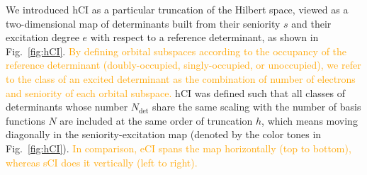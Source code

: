 \documentclass[aip,jcp,reprint,noshowkeys,superscriptaddress]{revtex4-1}
\newcommand{\fk}[1]{\textcolor{orange}{#1}}
\newcommand{\Ndet}{N_\text{det}}
\begin{document}
We introduced hCI \cite{Kossoski_2022} as a particular truncation of the Hilbert space,
viewed as a two-dimensional map of determinants built from their seniority $s$ and their excitation degree $e$ with respect to a reference determinant, as shown in Fig.~\ref{fig:hCI}. 
\fk{By defining orbital subspaces according to the occupancy of the reference determinant (doubly-occupied, singly-occupied, or unoccupied),
we refer to the class of an excited determinant as the combination of number of electrons and seniority of each orbital subspace.}
hCI was defined such that all classes of determinants whose number $\Ndet$ share the same scaling with the number of basis functions $N$ are included at the same order of truncation $h$,
which means moving diagonally in the seniority-excitation map (denoted by the color tones in Fig.~\ref{fig:hCI}).
\fk{In comparison, eCI spans the map horizontally (top to bottom), whereas sCI does it vertically (left to right).}
\end{document}
